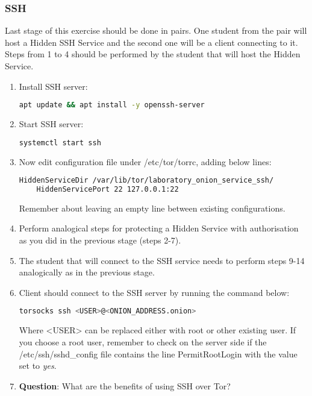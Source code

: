 \subsubsection{SSH}
Last stage of this exercise should be done in pairs. One student from the pair will host a Hidden SSH Service and the second one will be a client connecting to it. Steps from 1 to 4 should be performed by the student that will host the Hidden Service.

\begin{enumerate}
    \item Install SSH server:
    \begin{lstlisting}[language=bash]
    apt update && apt install -y openssh-server
    \end{lstlisting}
    \item Start SSH server:
    \begin{lstlisting}[language=bash]
    systemctl start ssh
    \end{lstlisting}
    \item Now edit configuration file under /etc/tor/torrc, adding below lines:
    \begin{lstlisting}[language=bash]
    HiddenServiceDir /var/lib/tor/laboratory_onion_service_ssh/
    HiddenServicePort 22 127.0.0.1:22
    \end{lstlisting}
    Remember about leaving an empty line between existing configurations.
    \item Perform analogical steps for protecting a Hidden Service with authorisation as you did in the previous stage (steps 2-7).
    \item The student that will connect to the SSH service needs to perform steps 9-14 analogically as in the previous stage.
    \item Client should connect to the SSH server by running the command below:
    \begin{lstlisting}[language=bash]
    torsocks ssh <USER>@<ONION_ADDRESS.onion>
    \end{lstlisting}
    Where <USER> can be replaced either with root or other existing user. If you choose a root user, remember to check on the server side if the /etc/ssh/sshd\_config file contains the line PermitRootLogin with the value set to \textit{yes}.
    \item \textbf{Question}: What are the benefits of using SSH over Tor?
\end{enumerate}

